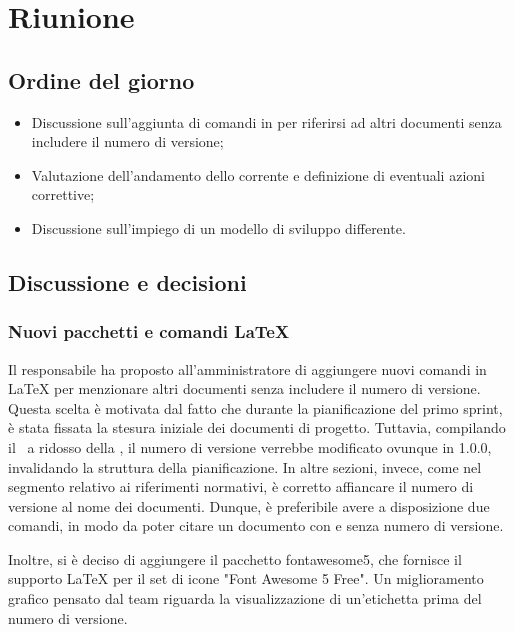 \section{Riunione}
\subsection{Ordine del giorno}
\begin{itemize}
	\item Discussione sull'aggiunta di comandi in  per riferirsi ad altri documenti senza includere il numero di versione;
  \item Valutazione dell'andamento dello  corrente e definizione di eventuali azioni correttive;
  \item Discussione sull'impiego di un modello di sviluppo differente.
\end{itemize}

\subsection{Discussione e decisioni}

\subsubsection{Nuovi pacchetti e comandi LaTeX}
\par Il responsabile ha proposto all'amministratore di aggiungere nuovi comandi in LaTeX per menzionare altri documenti senza includere il numero di versione. Questa scelta è motivata dal fatto che durante la pianificazione del primo sprint, è stata fissata la stesura iniziale dei documenti di progetto. Tuttavia, compilando il \PdP\ a ridosso della , il numero di versione verrebbe modificato ovunque in 1.0.0, invalidando la struttura della pianificazione. In altre sezioni, invece, come nel segmento relativo ai riferimenti normativi, è corretto affiancare il numero di versione al nome dei documenti. Dunque, è preferibile avere a disposizione due comandi, in modo da poter citare un documento con e senza numero di versione.
\par Inoltre, si è deciso di aggiungere il pacchetto fontawesome5, che fornisce il supporto LaTeX per il set di icone "Font Awesome 5 Free". Un miglioramento grafico pensato dal team riguarda la visualizzazione di un'etichetta prima del numero di versione.

